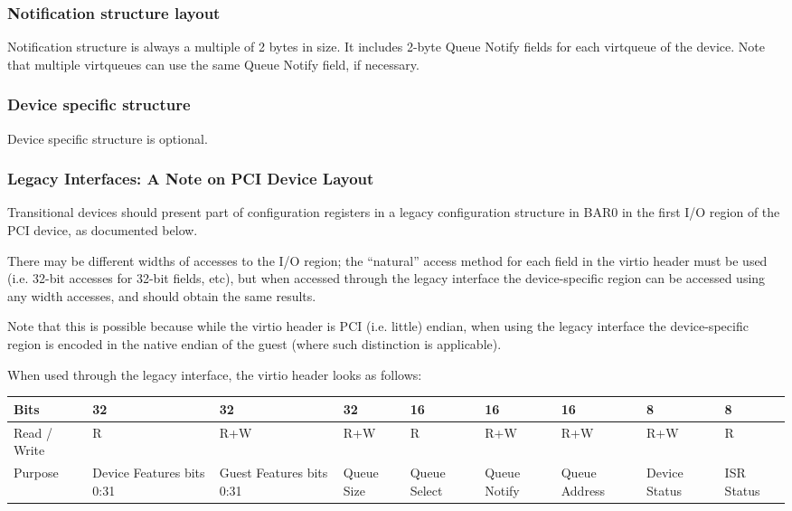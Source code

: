 \subsubsection{Notification structure layout}\label{sec:Virtio Transport Options / Virtio Over PCI Bus / PCI Device Layout / Notification structure layout}
Notification structure is always a multiple of 2 bytes in size.
It includes 2-byte Queue Notify fields for each virtqueue of
the device. Note that multiple virtqueues can use the same
Queue Notify field, if necessary.

\subsubsection{Device specific structure}\label{sec:Virtio Transport Options / Virtio Over PCI Bus / PCI Device Layout / Device specific structure}

Device specific structure is optional.

\subsubsection{Legacy Interfaces: A Note on PCI Device Layout}\label{sec:Virtio Transport Options / Virtio Over PCI Bus / PCI Device Layout / Legacy Interfaces: A Note on PCI Device Layout}

Transitional devices should present part of configuration
registers in a legacy configuration structure in BAR0 in the first I/O
region of the PCI device, as documented below.

There may be different widths of accesses to the I/O region; the
“natural” access method for each field in the virtio header must be
used (i.e. 32-bit accesses for 32-bit fields, etc), but 
when accessed through the legacy interface the
device-specific region can be accessed using any width accesses, and
should obtain the same results.

Note that this is possible because while the virtio header is PCI
(i.e. little) endian, when using the legacy interface the device-specific
region is encoded in the native endian of the guest (where such distinction is
applicable).

When used through the legacy interface, the virtio header looks as follows:

\begin{tabularx}{\textwidth}{ |X||X|X|X|X|X|X|X|X| }
\hline
 Bits & 32 & 32 & 32 & 16 & 16 & 16 & 8 & 8 \\
\hline
 Read / Write & R & R+W & R+W & R & R+W & R+W & R+W & R \\
\hline
 Purpose & Device Features bits 0:31 & Guest Features bits 0:31 &
  Queue Size & Queue Select & Queue Notify & Queue Address &
  Device Status & ISR \newline Status \\
\hline
\end{tabularx}

